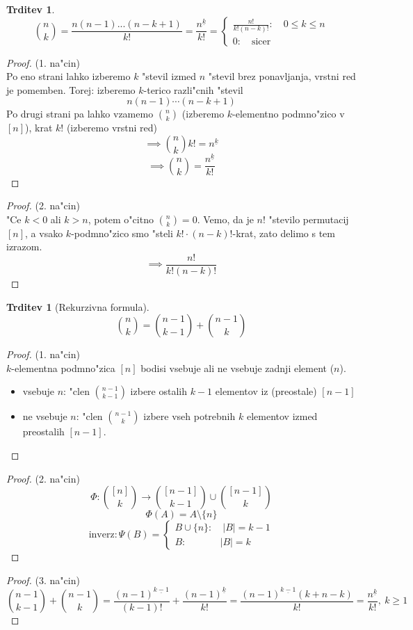\documentclass[a4paper,12pt]{article}
\theoremstyle{definition}
\newtheorem{claim}[counter]{Trditev}
\theoremstyle{remark}
\begin{document}
\begin{claim}
	\[\binom{n}{k} = \frac{n(n-1)...(n-k+1)}{k!} = \frac{n^{\underline{k}}}{k!} = \begin{cases}\frac{n!}{k!(n-k)!}: \quad 0 \leq k \leq n   \\ 0: \quad \text{sicer} \end{cases}\]
\end{claim}
\begin{proof}(1. na"cin)\\
	Po eno strani lahko izberemo $k$ "stevil izmed $n$ "stevil brez ponavljanja, vrstni red je pomemben.
	Torej: izberemo $k$-terico razli"cnih "stevil
	\[n(n-1)\cdots(n-k+1)\]
	Po drugi strani pa lahko vzamemo $\binom{n}{k}$ (izberemo $k$-elementno podmno"zico v $[n]$), krat $k!$ (izberemo vrstni red)
	\[\implies \binom{n}{k} k! = n^{\underline{k}}\]
	\[\implies \binom{n}{k} = \frac{n^{\underline{k}}}{k!}\]
\end{proof}
\begin{proof}(2. na"cin)\\
	"Ce $k < 0$ ali $k > n$, potem o"citno $\binom{n}{k} = 0$. Vemo, da je $n!$ "stevilo permutacij $[n]$, a vsako $k$-podmno"zico smo "steli $k!\cdot(n-k)!$-krat, zato delimo s tem izrazom.
	\[\implies \frac{n!}{k! (n-k)!}\]
\end{proof}

\begin{claim}[Rekurzivna formula]
	\[\binom{n}{k} = \binom{n-1}{k-1} + \binom{n-1}{k}\]
\end{claim}

\begin{proof}(1. na"cin)\\
	$k$-elementna podmno"zica $[n]$ bodisi vsebuje ali ne vsebuje zadnji element ($n$).
	\begin{itemize}
	    \item vsebuje $n$: "clen $\binom{n-1}{k-1}$ izbere ostalih $k-1$ elementov iz (preostale) $[n-1]$
	    \item ne vsebuje $n$: "clen $\binom{n-1}{k}$ izbere vseh potrebnih $k$ elementov izmed preostalih $[n-1]$.
	\end{itemize}
\end{proof}
\begin{proof}(2. na"cin)\\
	\[\Phi : \binom{[n]}{k}\rightarrow \binom{[n - 1]}{k - 1} \cup \binom{[n - 1]}{k}\]
	\[\Phi (A) = A \setminus \{n\}\]
	\[\text{inverz}: \Psi(B) = \begin{cases}B \cup \{n\}: \quad |B| = k - 1 \\ B: \qquad \quad \ \ |B| = k \end{cases}\]
\end{proof}
\begin{proof}(3. na"cin)\\
	\[\binom{n - 1}{k - 1}+\binom{n-1}{k} = \frac{(n-1)^{\underline{k-1}}}{(k-1)!} + \frac{(n-1)^{\underline{k}}}{k!} = \frac{(n-1)^{\underline{k-1}}(k+n-k)}{k!} = \frac{n^{\underline{k}}}{k!}, \ k \geqslant1\]
\end{proof}
\end{document}
